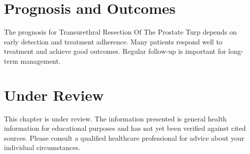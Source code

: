 \section*{Prognosis and Outcomes}
The prognosis for Transurethral Resection Of The Prostate Turp depends on early detection and treatment adherence. Many patients respond well to treatment and achieve good outcomes. Regular follow-up is important for long-term management.
\section*{Under Review}
This chapter is under review. The information presented is general health information for educational purposes and has not yet been verified against cited sources. Please consult a qualified healthcare professional for advice about your individual circumstances.


\clearpage
